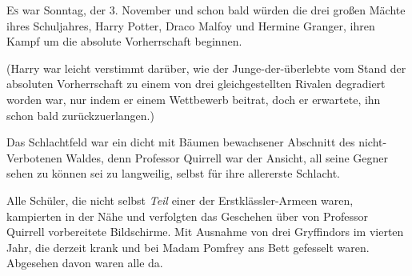 

\lettrine{E}{s} war Sonntag, der 3. November und schon bald würden die drei großen Mächte ihres Schuljahres, Harry Potter, Draco Malfoy und Hermine Granger, ihren Kampf um die absolute Vorherrschaft beginnen.

(Harry war leicht verstimmt darüber, wie der Junge-der-überlebte vom Stand der absoluten Vorherrschaft zu einem von drei gleichgestellten Rivalen degradiert worden war, nur indem er einem Wettbewerb beitrat, doch er erwartete, ihn schon bald zurückzuerlangen.)

Das Schlachtfeld war ein dicht mit Bäumen bewachsener Abschnitt des nicht-Verbotenen Waldes, denn Professor Quirrell war der Ansicht, all seine Gegner sehen zu können sei zu langweilig, selbst für ihre allererste Schlacht.

Alle Schüler, die nicht selbst \emph{Teil} einer der Erstklässler-Armeen waren, kampierten in der Nähe und verfolgten das Geschehen über von Professor Quirrell vorbereitete Bildschirme. Mit Ausnahme von drei Gryffindors im vierten Jahr, die derzeit krank und bei Madam Pomfrey ans Bett gefesselt waren. Abgesehen davon waren alle da.

